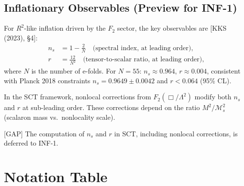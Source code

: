 \documentclass[12pt,a4paper]{article}
\theoremstyle{definition}
\theoremstyle{remark}
\newcommand{\fromlit}[1]{\textcolor{blue!70!black}{\textsf{[#1]}}}
\newcommand{\gap}{\textcolor{red!80!black}{\textsf{[GAP]}}}
\begin{document}
\subsection{Inflationary Observables (Preview for INF-1)}

For $R^2$-like inflation driven by the $F_2$ sector, the key
observables are \fromlit{KKS (2023), \S4}:
\begin{align}
  n_s &= 1 - \frac{2}{N}
  \quad \text{(spectral index, at leading order)},
  \label{eq:ns}\\
  r &= \frac{12}{N^2}
  \quad \text{(tensor-to-scalar ratio, at leading order)},
  \label{eq:r}
\end{align}
where $N$ is the number of e-folds. For $N = 55$:
$n_s \approx 0.964$, $r \approx 0.004$, consistent with Planck 2018
constraints $n_s = 0.9649 \pm 0.0042$ and $r < 0.064$ (95\% CL).

In the SCT framework, nonlocal corrections from $F_2(\Box/\Lambda^2)$
modify both $n_s$ and $r$ at sub-leading order. These corrections
depend on the ratio $M^2/\mathcal{M}_s^2$ (scalaron mass vs.\
nonlocality scale).

\gap{} The computation of $n_s$ and $r$ in SCT, including
nonlocal corrections, is deferred to INF-1.

\section{Notation Table}\label{sec:notation}
\end{document}
